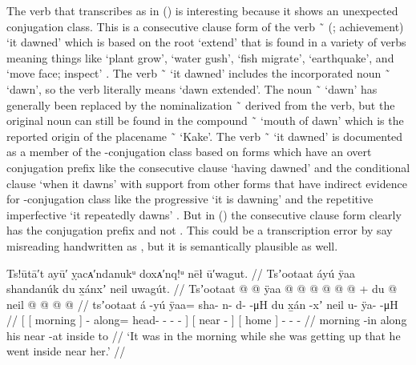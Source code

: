 The verb that \citeauthor{swanton:1909} transcribes as  in (\lastx) is interesting because it shows an unexpected conjugation class.
This is a consecutive clause form of the verb  \~\  (; achievement) ‘it dawned’ which is based on the root  ‘extend’ that is found in a variety of verbs meaning things like ‘plant grow’, ‘water gush’, ‘fish migrate’, ‘earthquake’, and ‘move face; inspect’ \parencite[72–78]{leer:1976}.
The verb  \~\  ‘it dawned’ includes the incorporated noun  \~\  ‘dawn’, so the verb literally means ‘dawn extended’.
The noun  \~\  ‘dawn’ has generally been replaced by the nominalization  \~\  derived from the verb, but the original noun can still be found in the compound  \~\  ‘mouth of dawn’ which is the reported origin of the placename  \~\  ‘Kake’.
The verb  \~\  ‘it dawned’ is documented as a member of the -conjugation class based on forms which have an overt  conjugation prefix like the consecutive clause  ‘having dawned’ and the conditional clause  ‘when it dawns’ \parencite[02/10]{leer:1973} with support from other forms that have indirect evidence for -conjugation class like the progressive  ‘it is dawning’ and the repetitive imperfective  ‘it repeatedly dawns’ \parencite[3]{leer:1963}.
But in (\lastx) the consecutive clause form  clearly has the  conjugation prefix and not .
This could be a transcription error by say misreading handwritten  as , but it is semantically plausible as well.


\ex\label{ex:94-12-while-waking-went-inside-near}%
%
\begingl
	\glpreamble	Ts!ūtā′t ayū′ ỵacᴀ′ndanukᵘ doxᴀ′nq!ᵘ nēł ū′wagut. //
	\glpreamble	Tsʼootaat áyú ÿaa shandanúk du x̱ánxʼ neil uwagút. //
	\gla	{} {} Tsʼootaat @ {} {}  @ {} 
			ÿaa @  @ {} @ {} @ {} @ {} @ {} {} +
		{} du  @ {} {}
		{} neil @ {} {}
		 @ {} @ {} @ {} //
	\glb	{} {} tsʼootaat {} {} á -yú
		ÿaa= sha- n- d-  -μH {} {}
		{} du x̱án -xʼ {}
		{} neil {} {}
		u- ÿa-  -μH //
	\glc	{}[ {}[ morning \· {}]  -
			along= head- - -  - \· {}]
		{}[  near - {}]
		{}[ home \· {}]
		- -  - //
	\gld	{} {} morning -in {} 
			along  {} {} {} {} {} {} {}
		{} his near -at {}
		{} inside \·to {}
		 {} {} {} //
	\glft	‘It was in the morning while she was getting up that he went inside near her.’
		//
\endgl
\xe

